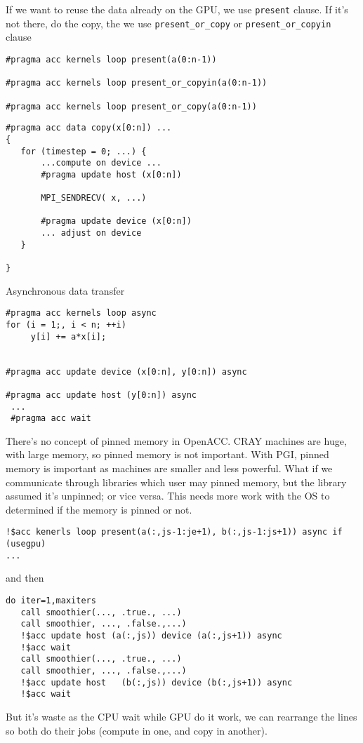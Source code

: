 If we want to reuse the data already on the GPU, we use \verb!present! clause.
If it's not there, do the copy, the we use \verb!present_or_copy! or
\verb!present_or_copyin! clause
\begin{verbatim}
#pragma acc kernels loop present(a(0:n-1))

#pragma acc kernels loop present_or_copyin(a(0:n-1))

#pragma acc kernels loop present_or_copy(a(0:n-1))

\end{verbatim}

\begin{verbatim}
#pragma acc data copy(x[0:n]) ...
{
   for (timestep = 0; ...) {
       ...compute on device ...
       #pragma update host (x[0:n])
       
       MPI_SENDRECV( x, ...)
       
       #pragma update device (x[0:n])
       ... adjust on device
   }
   
}
\end{verbatim}


Asynchronous data transfer
\begin{verbatim}
#pragma acc kernels loop async
for (i = 1;, i < n; ++i) 
     y[i] += a*x[i];


#pragma acc update device (x[0:n], y[0:n]) async

#pragma acc update host (y[0:n]) async
 ...
 #pragma acc wait
\end{verbatim}

There's no concept of pinned memory in OpenACC. CRAY machines are huge, with
large memory, so pinned memory is not important. With PGI, pinned memory is
important as machines are smaller and less powerful. What if we communicate
through libraries which user may pinned memory, but the library assumed it's
unpinned; or vice versa. This needs more work with the OS to determined if the
memory is pinned or not. 

\begin{verbatim}
!$acc kenerls loop present(a(:,js-1:je+1), b(:,js-1:js+1)) async if (usegpu)
...
\end{verbatim}
and then
\begin{verbatim}
do iter=1,maxiters
   call smoothier(..., .true., ...)
   call smoothier, ..., .false.,...)
   !$acc update host (a(:,js)) device (a(:,js+1)) async
   !$acc wait
   call smoothier(..., .true., ...)
   call smoothier, ..., .false.,...)
   !$acc update host   (b(:,js)) device (b(:,js+1)) async
   !$acc wait
\end{verbatim}
But it's waste as the CPU wait while GPU do it work, we can rearrange the lines
so both do their jobs (compute in one, and copy in another).


